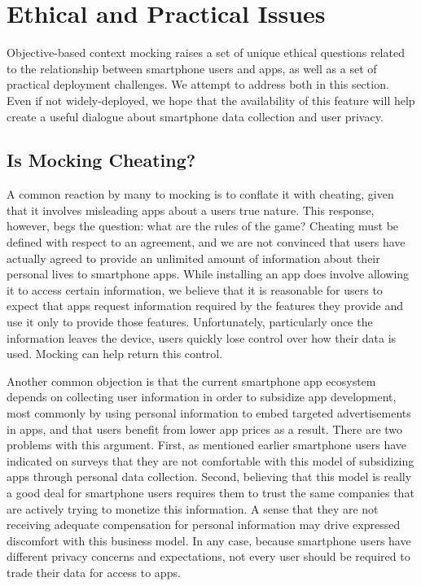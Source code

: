 \section{Ethical and Practical Issues}
\label{sec-ethics}

Objective-based context mocking raises a set of unique ethical questions
related to the relationship between smartphone users and apps, as well as a
set of practical deployment challenges. We attempt to address both in this
section. Even if not widely-deployed, we hope that the availability of this
feature will help create a useful dialogue about smartphone data collection
and user privacy.

\subsection{Is Mocking Cheating?}

A common reaction by many to mocking is to conflate it with cheating, given
that it involves misleading apps about a users true nature. This response,
however, begs the question: what are the rules of the game? Cheating must be
defined with respect to an agreement, and we are not convinced that users
have actually agreed to provide an unlimited amount of information about
their personal lives to smartphone apps. While installing an app does involve
allowing it to access certain information, we believe that it is reasonable
for users to expect that apps request information required by the features
they provide and use it only to provide those features. Unfortunately,
particularly once the information leaves the device, users quickly lose
control over how their data is used. Mocking can help return this control.

Another common objection is that the current smartphone app ecosystem depends
on collecting user information in order to subsidize app development, most
commonly by using personal information to embed targeted advertisements in
apps, and that users benefit from lower app prices as a result. There are two
problems with this argument. First, as mentioned earlier smartphone users
have indicated on surveys that they are not comfortable with this model of
subsidizing apps through personal data collection. Second, believing that
this model is really a good deal for smartphone users requires them to trust
the same companies that are actively trying to monetize this information. A
sense that they are not receiving adequate compensation for personal
information may drive expressed discomfort with this business model. In any
case, because smartphone users have different privacy concerns and
expectations, not every user should be required to trade their data for
access to apps.


